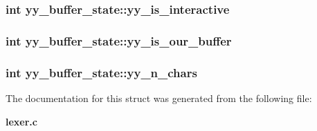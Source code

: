 \subsubsection{\setlength{\rightskip}{0pt plus 5cm}int yy\_\-buffer\_\-state::yy\_\-is\_\-interactive}\label{structyy__buffer__state_m6}


\subsubsection{\setlength{\rightskip}{0pt plus 5cm}int yy\_\-buffer\_\-state::yy\_\-is\_\-our\_\-buffer}\label{structyy__buffer__state_m5}


\subsubsection{\setlength{\rightskip}{0pt plus 5cm}int yy\_\-buffer\_\-state::yy\_\-n\_\-chars}\label{structyy__buffer__state_m4}




The documentation for this struct was generated from the following file:\begin{CompactItemize}
\item 
{\bf lexer.c}\end{CompactItemize}
